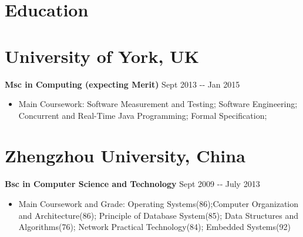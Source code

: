 \documentclass[margin]{res}
\begin{document}
  
\address{{\bf Present Address} \\ 37, Broadway west \\ 
York\\ YO10 4JN}
\address{{\bf Email Address} \\ fanlu91@gmail.com \\ {\bf Phone Number} \\
(044)7706 234389
}
\begin{resume} 
\section{Education} 
\section{University of York, UK} 
{\bf Msc in Computing (expecting Merit) } \hfill Sept
2013 -­‐ Jan 2015  \\
\begin{itemize}
  \item Main Coursework: Software
  Measurement and Testing; Software Engineering; Concurrent and Real-Time Java
  Programming; Formal Specification;
\end{itemize}
\section{Zhengzhou University, China}  
{\bf Bsc in Computer Science and Technology } \hfill Sept 2009 -­‐ July 2013\\
\begin{itemize}
\item Main Coursework and Grade: Operating Systems(86);Computer
Organization and Architecture(86); Principle of Database System(85); Data
Structures and Algorithms(76); Network Practical Technology(84); Embedded
Systems(92)
\end{itemize}

\end{resume}
\end{document}
